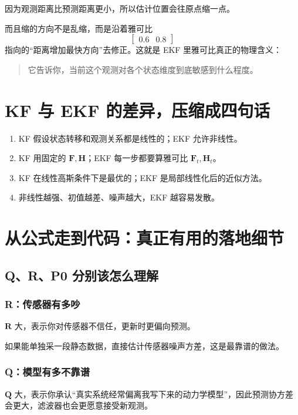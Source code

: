 \documentclass[12pt,a4paper]{ctexart}
\begin{document}
因为观测距离比预测距离更小，所以估计位置会往原点缩一点。

而且缩的方向不是乱缩，而是沿着雅可比
\[
\begin{bmatrix}
0.6 & 0.8
\end{bmatrix}
\]
指向的“距离增加最快方向”去修正。这就是 EKF 里雅可比真正的物理含义：

\begin{quote}
它告诉你，当前这个观测对各个状态维度到底敏感到什么程度。
\end{quote}

\section{KF 与 EKF 的差异，压缩成四句话}

\begin{enumerate}
  \item KF 假设状态转移和观测关系都是线性的；EKF 允许非线性。
  \item KF 用固定的 \(\bm{F}, \bm{H}\)；EKF 每一步都要算雅可比 \(\bm{F}_t, \bm{H}_t\)。
  \item KF 在线性高斯条件下是最优的；EKF 是局部线性化后的近似方法。
  \item 非线性越强、初值越差、噪声越大，EKF 越容易发散。
\end{enumerate}

\section{从公式走到代码：真正有用的落地细节}

\subsection{Q、R、P0 分别该怎么理解}

\subsubsection{R：传感器有多吵}

\(\bm{R}\) 大，表示你对传感器不信任，更新时更偏向预测。

如果能单独采一段静态数据，直接估计传感器噪声方差，这是最靠谱的做法。

\subsubsection{Q：模型有多不靠谱}

\(\bm{Q}\) 大，表示你承认“真实系统经常偏离我写下来的动力学模型”，因此预测协方差会更大，滤波器也会更愿意接受新观测。
\end{document}
